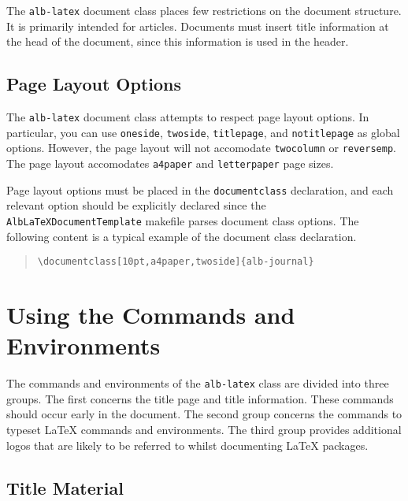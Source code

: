 \documentclass[11pt,a4paper,oneside,titlepage]{alb-latex}
\begin{document}
The \texttt{alb-latex} document class places few restrictions on the
document structure.  It is primarily intended for articles.  Documents
must insert title information at the head of the document, since this
information is used in the header.



\subsection{Page Layout Options}
\label{sec:alb-latex:page-layout-opti}

The \texttt{alb-latex} document class attempts to respect page layout
options.  In particular, you can use \texttt{oneside}, \texttt{twoside},
\texttt{titlepage}, and \texttt{notitlepage} as global options.
However, the page layout will not accomodate \texttt{twocolumn} or
\texttt{reversemp}.  The page layout accomodates \texttt{a4paper} and
\texttt{letterpaper} page sizes.

Page layout options must be placed in the \texttt{documentclass}
declaration, and each relevant option should be explicitly declared
since the \texttt{AlbLaTeXDocumentTemplate} makefile parses document
class options.  The following content is a typical example of the
document class declaration.
\begin{quote}
\begin{verbatim}
\documentclass[10pt,a4paper,twoside]{alb-journal}
\end{verbatim}
\end{quote}




\section{Using the Commands and Environments}
\label{sec:alb-latex:using-comm-envir}

The commands and environments of the \texttt{alb-latex} class are divided
into three groups.  The first concerns the title page and title
information.  These commands should occur early in the document.  The
second group concerns the commands to typeset \LaTeX{} commands and
environments.  The third group provides additional logos that are likely
to be referred to whilst documenting \LaTeX{} packages.



\subsection{Title Material}
\label{sec:alb-latex:title-mater}
\end{document}
